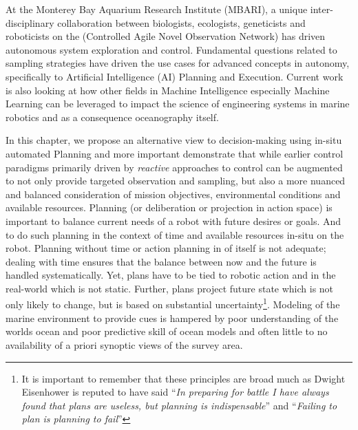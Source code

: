 At the Monterey Bay Aquarium Research Institute (MBARI), a unique
inter-disciplinary collaboration between biologists, ecologists,
geneticists and roboticists on the \can (Controlled Agile Novel
Observation Network) \cite{canon} has driven autonomous system
exploration and control. Fundamental questions related to sampling
strategies have driven the use cases for advanced concepts in
autonomy, specifically to Artificial Intelligence (AI) Planning and
Execution. Current work is also looking at how other fields in Machine
Intelligence especially Machine Learning can be leveraged to impact
the science of engineering systems in marine robotics and as a
consequence oceanography itself.

In this chapter, we propose an alternative view to decision-making
using in-situ automated Planning \cite{ghallab04} and more important
demonstrate that while earlier control paradigms primarily driven by
\emph{reactive} approaches to control can be augmented to not only
provide targeted observation and sampling, but also a more nuanced and
balanced consideration of mission objectives, environmental conditions
and available resources. Planning (or deliberation or projection in
action space) is important to balance current needs of a robot with
future desires or goals. And to do such planning in the context of
time and available resources in-situ on the robot. Planning without
time or action planning in of itself is not adequate; dealing with
time ensures that the balance between now and the future is handled
systematically. Yet, plans have to be tied to robotic action and in
the real-world which is not static. Further, plans project future
state which is not only likely to change, but is based on substantial
uncertainty\footnote{It is important to remember that these principles
  are broad much as Dwight Eisenhower is reputed to have said
  ``\emph{In preparing for battle I have always found that plans are
    useless, but planning is indispensable}'' and ``\emph{Failing to
    plan is planning to fail}''}. Modeling of the marine environment
to provide cues is hampered by poor understanding of the worlds ocean
and poor predictive skill of ocean models and often little to no
availability of a priori synoptic views of the survey area. 

